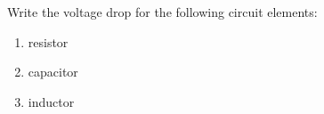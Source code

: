 

\vspace*{\fill}
\centering

Write the voltage drop for the following circuit elements:
\begin{enumerate}
    \item resistor
    \item capacitor
    \item inductor
\end{enumerate}

\centering
\vspace*{\fill}

